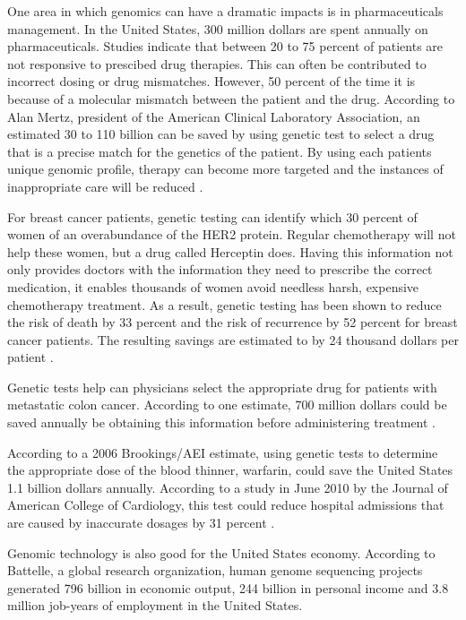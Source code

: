 \documentclass[sigconf]{acmart}
\begin{document}
One area in which genomics can have a dramatic impacts is in pharmaceuticals management. In the United States, 300 million dollars are spent annually on pharmaceuticals. Studies indicate that between 20 to 75 percent of patients are not responsive to prescibed drug therapies.  This can often be contributed to incorrect dosing or drug mismatches. However, 50 percent of the time it is because of a molecular mismatch between the patient and the drug. According to Alan Mertz, president of the American Clinical Laboratory Association, an estimated 30 to 110 billion can be saved by using genetic test to select a drug that is a precise match for the genetics of the patient. By using each patients unique genomic profile, therapy can become more targeted and the instances of inappropriate care will be reduced \cite{www-google-geno}.

For breast cancer patients, genetic testing can identify which 30 percent of women of an overabundance of the HER2 protein. Regular chemotherapy will not help these women, but a drug called Herceptin does. Having this information not only provides doctors with the information they need to prescribe the correct medication, it enables thousands of women avoid needless harsh, expensive chemotherapy treatment.  As a result, genetic testing has been shown to reduce the risk of death by 33 percent and the risk of recurrence by 52 percent for breast cancer patients. The resulting savings are estimated to by 24 thousand dollars per patient \cite{www-google-geno}.

Genetic tests help can physicians select the appropriate drug for patients with metastatic colon cancer. According to one estimate, 700 million dollars could be saved annually be obtaining this information before administering treatment \cite{www-google-geno}.

According to a 2006 Brookings/AEI estimate, using genetic tests to determine the appropriate dose of the blood thinner, warfarin, could save the United States 1.1 billion dollars annually.  According to a study in June 2010 by the Journal of American College of Cardiology, this test could reduce hospital admissions that are caused by inaccurate dosages by 31 percent \cite{www-google-geno}.

Genomic technology is also good for the United States economy. According to Battelle, a global research organization, human genome sequencing projects generated 796 billion in economic output, 244 billion in personal income and 3.8 million job-years of employment in the United States. 
\end{document}
